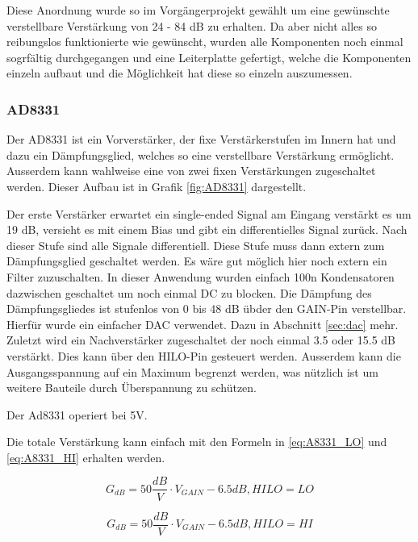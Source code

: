 Diese Anordnung wurde so im Vorgängerprojekt gewählt um eine gewünschte verstellbare Verstärkung von 24 - 84 dB zu erhalten.
Da aber nicht alles so reibungslos funktionierte wie gewünscht, wurden alle Komponenten noch einmal sogrfältig durchgegangen und eine Leiterplatte gefertigt, welche die Komponenten einzeln aufbaut und die Möglichkeit hat diese so einzeln auszumessen.

\subsubsection{AD8331}

Der AD8331 ist ein Vorverstärker, der fixe Verstärkerstufen im Innern hat und dazu ein Dämpfungsglied, welches so eine verstellbare Verstärkung ermöglicht. Ausserdem kann wahlweise eine von zwei fixen Verstärkungen zugeschaltet werden. Dieser Aufbau ist in Grafik \ref{fig:AD8331} dargestellt.

Der erste Verstärker erwartet ein single-ended Signal am Eingang verstärkt es um 19 dB, versieht es mit einem Bias und gibt ein differentielles Signal zurück. Nach dieser Stufe sind alle Signale differentiell.
Diese Stufe muss dann extern zum Dämpfungsglied geschaltet werden. Es wäre gut möglich hier noch extern ein Filter zuzuschalten. In dieser Anwendung wurden einfach 100n Kondensatoren dazwischen geschaltet um noch einmal DC zu blocken.
Die Dämpfung des Dämpfungsgliedes ist stufenlos von 0 bis 48 dB übder den GAIN-Pin verstellbar. Hierfür wurde ein einfacher DAC verwendet. Dazu in Abschnitt \ref{sec:dac} mehr.
Zuletzt wird ein Nachverstärker zugeschaltet der noch einmal 3.5 oder 15.5 dB verstärkt. Dies kann über den HILO-Pin gesteuert werden.
Ausserdem kann die Ausgangsspannung auf ein Maximum begrenzt werden, was nützlich ist um weitere Bauteile durch Überspannung zu schützen.

Der Ad8331 operiert bei 5V.

Die totale Verstärkung kann einfach mit den Formeln in \ref{eq:A8331_LO} und \ref{eq:A8331_HI} erhalten werden.

\begin{equation}
    G_{dB} = 50 \frac{dB}{V} \cdot V_{GAIN} - 6.5 dB, HILO = LO
\label{eq:A8331_LO}
\end{equation}

\begin{equation}
    G_{dB} = 50 \frac{dB}{V} \cdot V_{GAIN} - 6.5 dB, HILO = HI
\label{eq:A8331_HI}
\end{equation}

